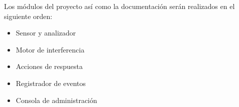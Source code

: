 Los módulos del proyecto así como la documentación serán realizados en el siguiente orden:

\begin{itemize}
	\item Sensor y analizador

	\item Motor de interferencia

	\item Acciones de respuesta

	\item Registrador de eventos

	\item Consola de administración\\
\end{itemize}
